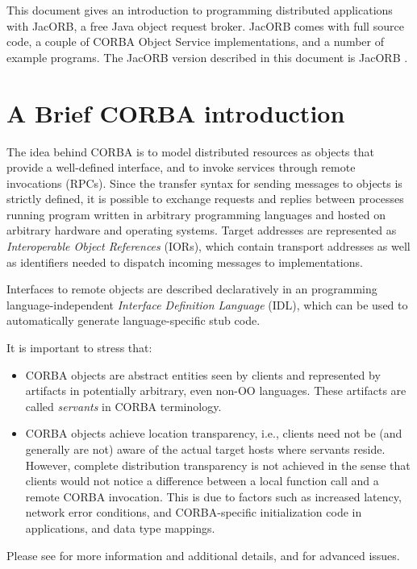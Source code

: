%
%

This document gives an introduction to programming distributed
applications with JacORB, a free Java object request broker. JacORB
comes with full source code, a couple of CORBA Object Service
implementations, and a number of example programs.  The JacORB version
described in this document is JacORB \JacORBVersion.

\section{A Brief CORBA introduction}

The idea behind CORBA is to model distributed resources as objects
that provide a well-defined interface, and to invoke services through
remote invocations (RPCs). Since the transfer syntax for
sending messages to objects is strictly defined, it is possible to
exchange requests and replies between processes running program
written in arbitrary programming languages and hosted on arbitrary
hardware and operating systems. Target addresses are represented as
{\em Interoperable Object References} (IORs), which contain transport
addresses as well as identifiers needed to dispatch incoming messages
to implementations. 

Interfaces to remote objects are described declaratively in an
programming language-independent {\em Interface Definition Language}
(IDL), which can be used to automatically generate language-specific
stub code.

It is important to stress that:
\begin{itemize}
\item CORBA objects are abstract entities  seen by clients and
  represented by artifacts in potentially arbitrary, even non-OO
  languages. These artifacts are called {\em servants} in CORBA
  terminology.
\item CORBA objects achieve location transparency, i.e., clients need
  not be (and generally are not) aware of the actual target hosts
  where servants reside. However, complete distribution transparency
  is not achieved in the sense that clients would not notice a
  difference between a local function call and a remote CORBA
  invocation. This is due to factors such as increased latency,
  network error conditions, and CORBA-specific initialization code in
  applications, and data type mappings.
\end{itemize}

Please see \cite{Brose2001a,Siegel2000, Vinoski1997} for more
information and additional details, and \cite{Henning1999} for
advanced issues.

